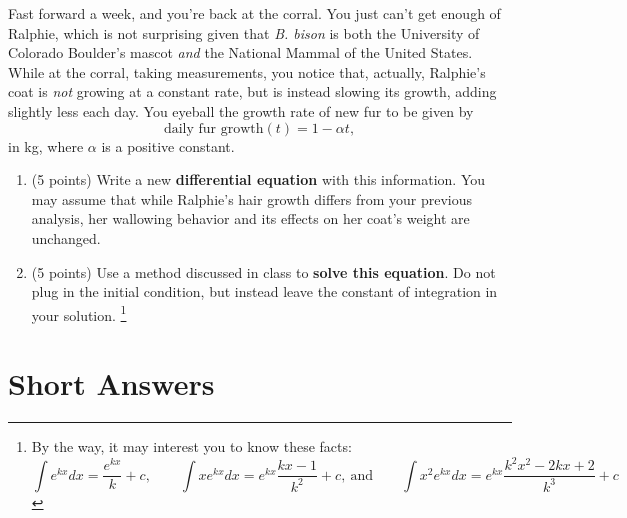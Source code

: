 \documentclass[11pt,onecolumn,superscriptaddress,notitlepage]{article}
\begin{document}
Fast forward a week, and you're back at the corral. You just can't get enough of Ralphie, which is not surprising given that {\it B. bison} is both the University of Colorado Boulder's mascot {\it and} the National Mammal of the United States. While at the corral, taking measurements, you notice that, actually, Ralphie's coat is {\it not} growing at a constant rate, but is instead slowing its growth, adding slightly less each day. You eyeball the growth rate of new fur to be given by 
$$\text{daily fur growth}(t) = 1-\alpha t,$$
in kg, where $\alpha$ is a positive constant. 

\begin{enumerate}[resume]
	\item (5 points) Write a new {\bf differential equation} with this information. You may assume that while Ralphie's hair growth differs from your previous analysis, her wallowing behavior and its effects on her coat's weight are unchanged. 
	
	\item (5 points) Use a method discussed in class to {\bf solve this equation}. Do not plug in the initial condition, but instead leave the constant of integration in your solution. \footnote{By the way, it may interest you to know these facts: 
	$$\int e^{kx}dx = \frac{e^{kx}}{k} +c,\qquad \int x e^{kx}dx = e^{k x} \frac{kx-1}{k^2}+c,\ \text{and} \qquad \int x^2 e^{kx}dx = e^{kx}\frac{k^2x^2-2kx+2}{k^3}+c$$}
\end{enumerate}

\clearpage

\section{Short Answers}
\end{document}
